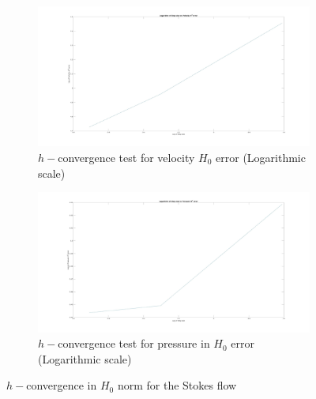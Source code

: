 \documentclass[a4paper,twoside,openright]{book}
\begin{document}
\begin{figure}
\begin{subfigure}{\textwidth}	
  \includegraphics[width=\linewidth]{h0_velocity_log_stokes.jpg}
  \caption{$h-$convergence test for velocity $H_0$ error (Logarithmic scale)}
  \label{fig:vel_stoke_conv_log_h0}
\end{subfigure}
\begin{subfigure}{\textwidth}	
  \includegraphics[width=\linewidth]{h0_pressure_log_stokes.jpg}
  \caption{$h-$convergence test for pressure in $H_0$ error (Logarithmic scale)}
  \label{fig:pre_stoke_conv_log_h0}
\end{subfigure}
\caption{$h-$convergence in $H_0$ norm for the Stokes flow}
\label{fig:h0_stokes}
\end{figure}
\end{document}
